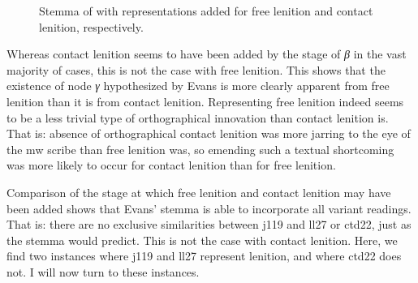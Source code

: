 \begin{figure}[h]\centering
  \caption{Stemma of  with representations added for free lenition and contact lenition, respectively.}
\label{fig:stemmaadditionsfreecont}
\end{figure}



Whereas contact lenition seems to have been added by the stage of \textit{β} in the vast majority of cases, this is not the case with free lenition. This shows that the existence of node \textit{γ} hypothesized by Evans is more clearly apparent from free lenition than it is from contact lenition. Representing free lenition indeed seems to be a less trivial type of orthographical innovation than contact lenition is. That is: absence of orthographical contact lenition was more jarring to the eye of the \gls{mw} scribe than free lenition was, so emending such a textual shortcoming was more likely to occur for contact lenition than for free lenition.


Comparison of the stage at which free lenition and contact lenition may have been added shows that Evans' stemma is able to incorporate all variant readings. That is: there are no exclusive similarities between \gls{j119} and \gls{ll27} or \gls{ctd22}, just as the stemma would predict. This is not the case with contact lenition. Here, we find two instances where \gls{j119} and \gls{ll27} represent lenition, and where \gls{ctd22} does not. I will now turn to these instances.

